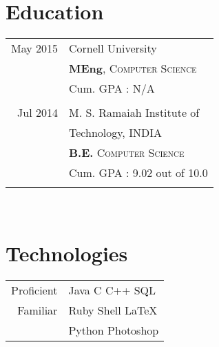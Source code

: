 \documentclass[10pt]{article} %
\begin{document}
{\begin{minipage}[t]{0.4\textwidth}

\section{\textbf{Education}}

\begin{tabular}{rl} %


May 2015 & \large{Cornell University}\\
& \textbf{MEng}, \textsc{Computer Science} \\ 
& \small Cum. GPA : N/A \\
&\\
	 

Jul 2014 & \large{M. S. Ramaiah Institute of} \\
& \large{Technology,} \normalsize{INDIA} \\
&  \textbf{B.E.} \textsc{Computer Science} \\ 
& \small Cum. GPA : 9.02 out of 10.0\\
&\\
\end{tabular}\\[10pt]


\section{\textbf{Technologies}}
\begin{tabular}{rl}
Proficient
& Java \textbullet{} C \textbullet{} C++ \textbullet{} SQL
& \\
Familiar
& Ruby \textbullet{} Shell \textbullet{} \LaTeX \\
& Python \textbullet{} Photoshop\\
\end{tabular}\\


\end{minipage}}
\end{document}
